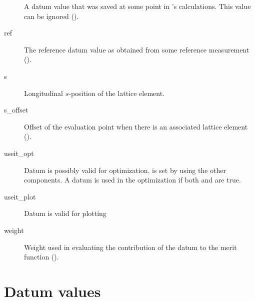 \begin{description}
A datum value that was saved at some point in \tao's calculations. This value
can be ignored ().
  \item[ref] \Newline
The reference datum value as obtained from some reference measurement ().
  \item[s] \Newline
Longitudinal $s$-position of the lattice element.
  \item[s_offset] \Newline
Offset of the evaluation point when there is an associated lattice element ().
  \item[useit_opt] \Newline
Datum is possibly valid for optimization.  is set by \tao using the other
 components. A datum is used in the optimization if both  and
 are true.
  \item[useit_plot] \Newline
Datum is valid for plotting
  \item[weight] \Newline
Weight used in evaluating the contribution of the datum to the merit function ().
\end{description}

\section{Datum values}
\label{s:datum.values}

